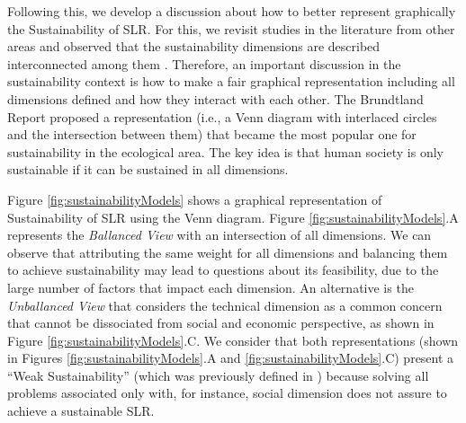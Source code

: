 \documentclass{article}
\begin{document}
Following this, we develop a discussion about how to better represent graphically the Sustainability of SLR. For this, we revisit studies in the literature from other areas \cite{Giddings2002Environment,keeble1988brundtland, Purvis2018three} and observed that the sustainability dimensions are described interconnected among them \cite{Purvis2018three}. Therefore, an important discussion in the sustainability context is how to make a fair graphical representation including all dimensions defined and how they interact with each other. The Brundtland Report \cite{keeble1988brundtland} proposed a representation (i.e., a Venn diagram with interlaced circles and the intersection between them) that became the most popular one for sustainability in the ecological area. The key idea is that human society is only sustainable if it can be sustained in all dimensions. 

Figure \ref{fig:sustainabilityModels} shows a graphical representation of Sustainability of SLR using the Venn diagram. Figure \ref{fig:sustainabilityModels}.A  represents the \textit{Ballanced View} with an intersection of all dimensions. We can observe that attributing the same weight for all dimensions and balancing them to achieve sustainability may lead to questions about its feasibility, due to the large number of factors that impact each dimension. %
An alternative is the \textit{Unballanced View} that considers the technical dimension as a common concern that cannot be dissociated from social and economic perspective, as shown in Figure \ref{fig:sustainabilityModels}.C.%
We consider that both representations (shown in Figures \ref{fig:sustainabilityModels}.A and \ref{fig:sustainabilityModels}.C) present a ``Weak Sustainability'' (which was previously defined in \cite{CabezaGuts1996}) because solving all problems associated only with, for instance, social dimension does not assure to achieve a sustainable SLR.
\end{document}
